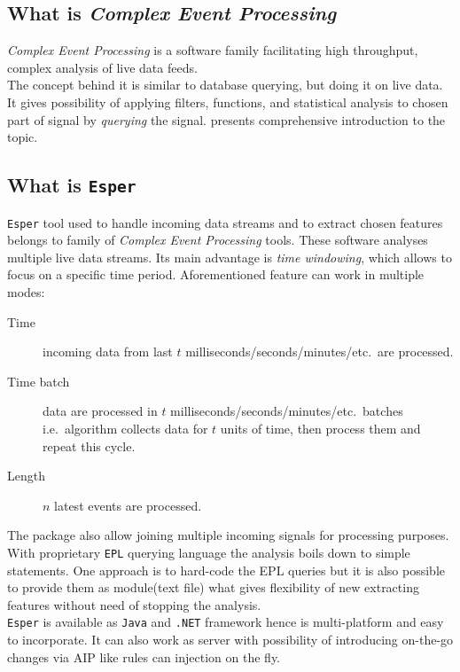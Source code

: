 \documentclass[11pt, letterpaper]{article}            %
\begin{document}
\subsection{What is \emph{Complex Event Processing}}
\emph{Complex Event Processing} is a software family facilitating high throughput, complex analysis of live data feeds.\\
The concept behind it is similar to database querying, but doing it on live data. It gives possibility of applying filters, functions, and statistical analysis to chosen part of signal by \emph{querying} the signal. \citep{Etzion:2010:EPA:1894960} presents comprehensive introduction to the topic.

\subsection{What is \texttt{Esper}}
\texttt{Esper} tool used to handle incoming data streams and to extract chosen features belongs to family of \emph{Complex Event Processing} tools. These software analyses multiple live data streams. Its main advantage is \emph{time windowing}, which allows to focus on a specific time period. Aforementioned feature can work in multiple modes:
\begin{description}
    \item[Time] incoming data from last $t$ milliseconds/seconds/minutes/etc.\ are processed.
    \item[Time batch] data are processed in $t$ milliseconds/seconds/minutes/etc.\ batches i.e.\ algorithm collects data for $t$ units of time, then process them and repeat this cycle.
    \item[Length] $n$ latest events are processed.
\end{description}
The package also allow joining multiple incoming signals for processing purposes. With proprietary \texttt{EPL} querying language the analysis boils down to simple statements. One approach is to hard-code the EPL queries but it is also possible to provide them as module(text file) what gives flexibility of new extracting features without need of stopping the analysis.\\
\texttt{Esper} is available as \texttt{Java} and \texttt{.NET} framework hence is multi-platform and easy to incorporate. It can also work as server with possibility of introducing on-the-go changes via AIP like rules can injection on the fly.\\
\end{document}
